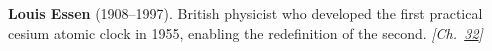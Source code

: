 \textbf{Louis Essen} (1908–1997). British physicist who developed the first practical cesium atomic clock in 1955, enabling the redefinition of the second. \emph{[Ch.~\hyperref[ch:atomic]{32}]}

